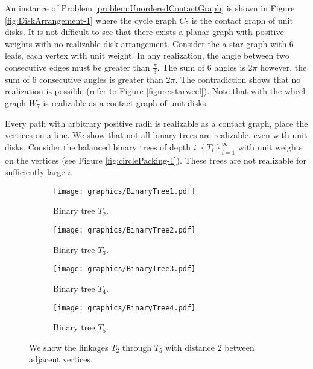 \documentclass[10pt]{CSUNthesis}
\theoremstyle{plain}%
\theoremstyle{definition}
\theoremstyle{remark}
\begin{document}
An instance of Problem \ref{problem:UnorderedContactGraph} is shown in Figure \ref{fig:DiskArrangement-1} where the cycle graph $C_5$ is the contact graph of unit disks.
It is not difficult to see that there exists a planar graph with positive weights with no realizable disk arrangement.
Consider the a star graph with 6 leafs, each vertex with unit weight.
In any realization, the angle between two consecutive edges must be greater than $\frac{\pi}{3}$. 
The sum of 6 angles is $2 \pi$ however, the sum of 6 consecutive angles is greater than $2\pi$.
The contradiction shows that no realization is possible (refer to Figure \ref{figure:starweel}).
Note that with the wheel graph $W_7$ is realizable as a contact graph of unit disks.

Every path with arbitrary positive radii is realizable as a contact graph, place the vertices on a line.
We show that not all binary trees are realizable, even with unit disks.%
Consider the balanced binary trees of depth $i$ $\left\lbrace T_i \right\rbrace_{i=1}^\infty$ with unit weights on the vertices (see Figure \ref{fig:circlePacking-1}).
These trees are not realizable for sufficiently large $i$.
\begin{figure}[!htbp]\label{fig:circlePacking-1}
\begin{center}
  \begin{subfigure}[b]{0.21\textwidth}
	  \texttt{[image: graphics/BinaryTree1.pdf]}
	  \caption{Binary tree $T_2$.}
	  \label{fig:circlePacking1-1}
  \end{subfigure}
  \begin{subfigure}[b]{0.21\textwidth}
	  \texttt{[image: graphics/BinaryTree2.pdf]}
	  \caption{Binary tree $T_3$.}
	  \label{fig:circlePacking1-2}
  \end{subfigure}
  \begin{subfigure}[b]{0.21\textwidth}
	  \texttt{[image: graphics/BinaryTree3.pdf]}
	  \caption{Binary tree $T_4$.}
	  \label{fig:circlePacking1-3}
  \end{subfigure}
  \begin{subfigure}[b]{0.21\textwidth}
	  \texttt{[image: graphics/BinaryTree4.pdf]}
	  \caption{Binary tree $T_5$.}
	  \label{fig:circlePacking1-4}
  \end{subfigure}
  \caption{ We show the linkages $T_2$ through $T_5$ with distance 2 between adjacent vertices.  }
\end{center} 
\end{figure}
\end{document}
